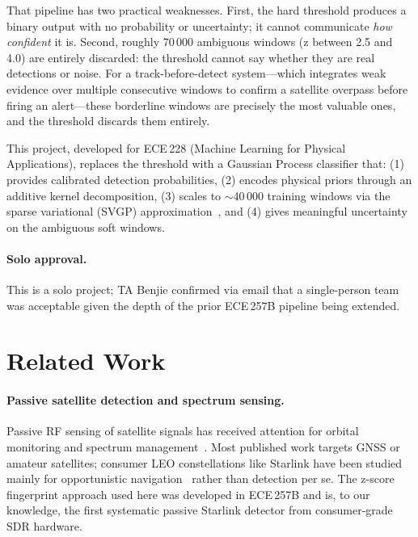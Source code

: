 \documentclass{article}
\begin{document}
That pipeline has two practical weaknesses.
First, the hard threshold produces a binary output with no probability or
uncertainty; it cannot communicate \emph{how confident} it is.
Second, roughly 70\,000 ambiguous windows (z between 2.5 and 4.0) are entirely
discarded: the threshold cannot say whether they are real detections or noise.
For a track-before-detect system---which integrates weak evidence over multiple
consecutive windows to confirm a satellite overpass before firing an alert---these
borderline windows are precisely the most valuable ones, and the threshold
discards them entirely.

This project, developed for ECE\,228 (Machine Learning for Physical Applications),
replaces the threshold with a Gaussian Process classifier that:
(1) provides calibrated detection probabilities,
(2) encodes physical priors through an additive kernel decomposition,
(3) scales to $\sim$40\,000 training windows via the sparse variational
    (SVGP) approximation~\cite{hensman2015scalable}, and
(4) gives meaningful uncertainty on the ambiguous soft windows.

\paragraph{Solo approval.}
This is a solo project; TA Benjie confirmed via email that a single-person team
was acceptable given the depth of the prior ECE\,257B pipeline being extended.

\section{Related Work}

\paragraph{Passive satellite detection and spectrum sensing.}
Passive RF sensing of satellite signals has received attention for orbital
monitoring and spectrum management~\cite{bhatt2023passive}.
Most published work targets GNSS or amateur satellites; consumer LEO constellations
like Starlink have been studied mainly for opportunistic navigation~\cite{neinavaie2021acquisition}
rather than detection per se.
The z-score fingerprint approach used here was developed in ECE\,257B and is,
to our knowledge, the first systematic passive Starlink detector from
consumer-grade SDR hardware.
\end{document}
